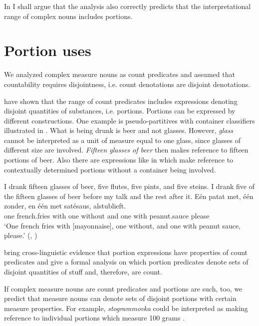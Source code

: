 \documentclass[output=paper]{langscibook}
\begin{document}
In  I shall argue that the analysis also correctly predicts that the interpretational range of complex nouns includes portions.

%
%
\section{Portion uses}\label{sec:5}\largerpage[2]
\begin{sloppypar}
We analyzed complex measure nouns as count predicates and assumed that countability requires disjointness, i.e. count denotations are disjoint denotations.
\end{sloppypar}

\citet{Khrizman.etal2015} have shown that the range of count predicates includes expressions denoting disjoint quantities of substances, i.e. portions. Portions can be expressed by different constructions. One example is pseudo-partitives with container classifiers illustrated in . What is being drunk is beer and not glasses. However, \textit{glass} cannot be interpreted as a unit of measure equal to one glass, since glasses of different size are involved. \textit{Fifteen glasses of beer} then makes reference to fifteen portions of beer. Also there are expressions like in  which make reference to contextually determined portions without a container being involved.


\ea\label{ex:khrizmann:35} I drank fifteen glasses of beer, five flutes, five pints, and five steins. I drank five of the fifteen glasses of beer before my talk and the rest after it. \hfill \citep[202]{Khrizman.etal2015}
\ex\label{ex:khrizmann:36} \gll Eén patat met, één zonder, en één met satésaus, alstublieft.\\
one french.fries with one without and one with peanut.sauce please\\
\glt `One french fries with [mayonnaise], one without, and one with peanut sauce, please.' \hfill (, \citealt[200]{Khrizman.etal2015})
\z

\noindent \citet{Khrizman.etal2015} bring cross-linguistic evidence that portion expressions have properties of count predicates and give a formal analysis on which portion predicates denote sets of disjoint quantities of stuff and, therefore, are count.

If complex measure nouns are count predicates and portions are such, too, we predict that measure nouns can denote sets of disjoint portions with certain measure properties. For example, \textit{stogrammovka} could be interpreted as making reference to individual portions which measure 100 grams .
\end{document}
